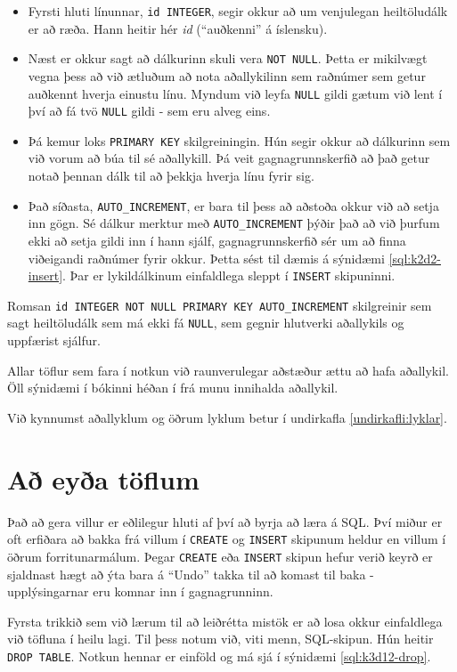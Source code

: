 \begin{itemize}
 \item Fyrsti hluti línunnar, \verb|id INTEGER|, segir okkur að um venjulegan heiltöludálk er að ræða. Hann heitir hér \emph{id} (``auðkenni'' á íslensku). 
 \item Næst er okkur sagt að dálkurinn skuli vera \verb|NOT NULL|. Þetta er mikilvægt vegna þess að við ætluðum að nota aðallykilinn sem raðnúmer sem getur auðkennt hverja einustu línu. Myndum við leyfa \verb|NULL| gildi gætum við lent í því að fá tvö \verb|NULL| gildi - sem eru alveg eins.
 \item Þá kemur loks \verb|PRIMARY KEY| skilgreiningin. Hún segir okkur að dálkurinn sem við vorum að búa til sé aðallykill. Þá veit gagnagrunnskerfið að það getur notað þennan dálk til að þekkja hverja línu fyrir sig.
 \item Það síðasta, \verb|AUTO_INCREMENT|, er bara til þess að aðstoða okkur við að setja inn gögn. Sé dálkur merktur með \verb|AUTO_INCREMENT| þýðir það að við þurfum ekki að setja gildi inn í hann sjálf, gagnagrunnskerfið sér um að finna viðeigandi raðnúmer fyrir okkur. Þetta sést til dæmis á sýnidæmi \ref{sql:k2d2-insert}. Þar er lykildálkinum einfaldlega sleppt í \verb|INSERT| skipuninni.
\end{itemize} 
Romsan \verb|id INTEGER NOT NULL PRIMARY KEY AUTO_INCREMENT| skilgreinir sem sagt heiltöludálk sem má ekki fá \verb|NULL|, sem gegnir hlutverki aðallykils og uppfærist sjálfur.

Allar töflur sem fara í notkun við raunverulegar aðstæður ættu að hafa aðallykil. Öll sýnidæmi í bókinni héðan í frá munu innihalda aðallykil.

Við kynnumst aðallyklum og öðrum lyklum betur í undirkafla \ref{undirkafli:lyklar}.
\section{Að eyða töflum} %
Það að gera villur er eðlilegur hluti af því að byrja að læra á SQL. Því miður er oft erfiðara að bakka frá villum í \verb|CREATE| og \verb|INSERT| skipunum heldur en villum í öðrum forritunarmálum. Þegar \verb|CREATE| eða \verb|INSERT| skipun hefur verið keyrð er sjaldnast hægt að ýta bara á ``Undo'' takka til að komast til baka - upplýsingarnar eru komnar inn í gagnagrunninn.

Fyrsta trikkið sem við lærum til að leiðrétta mistök er að losa okkur einfaldlega við töfluna í heilu lagi. Til þess notum við, viti menn, SQL-skipun. Hún heitir \verb|DROP TABLE|. Notkun hennar er einföld og má sjá í sýnidæmi \ref{sql:k3d12-drop}.

